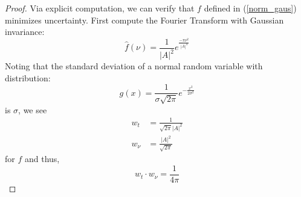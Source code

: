 \documentclass[12pt, reqno]{amsart}
\theoremstyle{definition}
\theoremstyle{remark}
\newcommand{\ud}{\mathrm{d}}
\begin{document}
\begin{itemize}
\begin{proof}
    Via explicit computation, we can verify that $f$ defined in (\ref{norm_gaus}) minimizes uncertainty. First compute the Fourier Transform with Gaussian invariance: $$
    \widehat f(\nu) = \frac{1}{|A|^{2}}e^{\frac{-\pi \nu^{2}}{|A|^{4}}} 
    $$
    Noting that the standard deviation of a normal random variable with distribution: $$
    g(x)= \frac{1}{\sigma \sqrt{2\pi}}e^{- \frac{x^{2}}{2\sigma^{2}}}
    $$
    is $\sigma$, we see \begin{align*}
    w_{t}&= \frac{1}{\sqrt{2\pi}|A|^{2}}\\
    w_{\nu}&= \frac{|A|^{2}}{\sqrt{2\pi}}
    \end{align*}
    for $f$ and thus, $$
    w_{t}\cdot w_{\nu}= \frac{1}{4\pi}
    $$
     
\end{proof}





\end{itemize}
\end{document}
